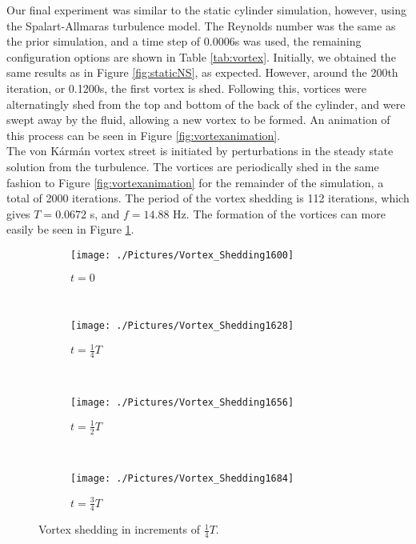 \documentclass[10pt, titlepage]{article}
\begin{document}
Our final experiment was similar to the static cylinder simulation, however, using the Spalart-Allmaras turbulence model. The Reynolds number was the same as the prior simulation, and a time step of 0.0006s was used, the remaining configuration options are  shown in Table \ref{tab:vortex}. Initially, we obtained the same results as in Figure \ref{fig:staticNS}, as expected. However, around the 200th iteration, or 0.1200s, the first vortex is shed. Following this, vortices were alternatingly shed from the top and bottom of the back of the cylinder, and were swept away by the fluid, allowing a new vortex to be formed. An animation of this process can be seen in Figure \ref{fig:vortexanimation}. \\

The von K\'{a}rm\'{a}n vortex street is initiated by perturbations in the steady state solution from the turbulence. The vortices are periodically shed in the same fashion to Figure \ref{fig:vortexanimation} for the remainder of the simulation, a total of 2000 iterations. The period of the vortex shedding is 112 iterations, which gives $T = 0.0672$ s, and $f = 14.88$ Hz. The formation of the vortices can more easily be seen in Figure \ref{fig:vortexstill}.

\begin{figure}
\begin{subfigure}{\linewidth}
  \centering
  \texttt{[image: ./Pictures/Vortex\_Shedding1600]}
  \caption{$t = 0$}
\end{subfigure} \\
\begin{subfigure}{\textwidth}
  \centering
  \texttt{[image: ./Pictures/Vortex\_Shedding1628]}
  \caption{$t = \frac{1}{4}T$}
\end{subfigure} \\
\begin{subfigure}{\linewidth}
  \centering
  \texttt{[image: ./Pictures/Vortex\_Shedding1656]}
  \caption{$t = \frac{1}{2}T$}
\end{subfigure} \\
\begin{subfigure}{\textwidth}
  \centering
  \texttt{[image: ./Pictures/Vortex\_Shedding1684]}
  \caption{$t = \frac{3}{4}T$}
\end{subfigure}
\caption[Vortex Shedding at $\frac{1}{4}T$ Increments]{Vortex shedding in increments of $\frac{1}{4}T$.}
\label{fig:vortexstill}
\end{figure}
\end{document}
